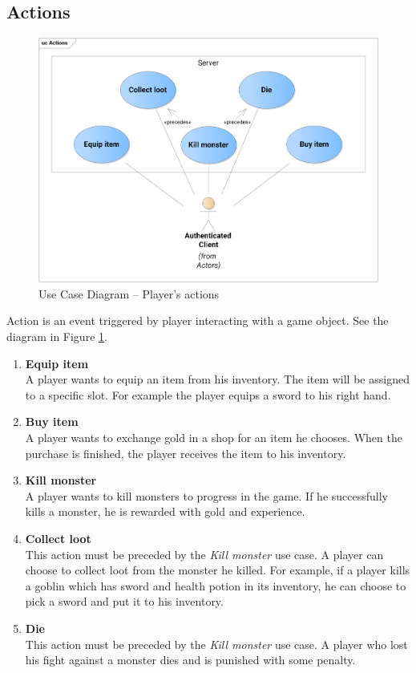 	\subsection{Actions}	
		\begin{figure}[h]	
			\includegraphics[width=\textwidth]{figures/UC_Actions}
			\centering			
			\caption{Use Case Diagram -- Player's actions}
			\label{fig:ucactions}
		\end{figure}
		\noindent Action is an event triggered by player interacting with a game object. See the diagram in Figure \ref{fig:ucactions}.
		
		\begin{enumerate}
			\item \textbf{Equip item} \\
			A player wants to equip an item from his inventory. The item will be assigned to a specific slot. For example the player equips a sword to his right hand.
			
			\item \textbf{Buy item} \\
			A player wants to exchange gold in a shop for an item he chooses. When the purchase is finished, the player receives the item to his inventory.
			
			\item \textbf{Kill monster} \\
			A player wants to kill monsters to progress in the game. If he successfully kills a monster, he is rewarded with gold and experience.
			
			\item \textbf{Collect loot} \\
			This action must be preceded by the \textit{Kill monster} use case. A player can choose to collect loot from the monster he killed. For example, if a player kills a goblin which has sword and health potion in its inventory, he can choose to pick a sword and put it to his inventory.
			
			\item \textbf{Die} \\
			This action must be preceded by the \textit{Kill monster} use case. A player who lost his fight against a monster dies and is punished with some penalty.		
		\end{enumerate}
	
